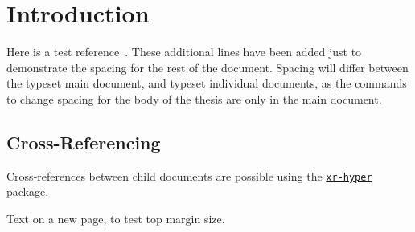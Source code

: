 \documentclass[\main/thesis.tex]{subfiles}
\begin{document}
\chapter{Introduction}

Here is a test reference~\cite{Knuth68:art_of_programming}.
These additional lines have been added just to demonstrate the spacing
for the rest of the document. Spacing will differ between the typeset main
document, and typeset individual documents, as the commands
to change spacing for the body of the thesis are only in the main document.

\section{Cross-Referencing}\label{sec:crossRef}

Cross-references between child documents are possible using the
\href{https://ctan.org/pkg/xr-hyper}{\texttt{xr-hyper}} package.

\newpage

Text on a new page, to test top margin size.
\end{document}
